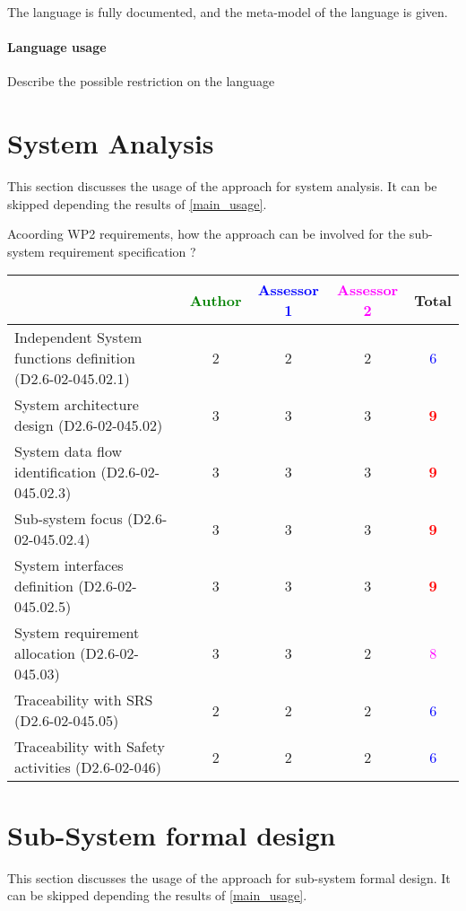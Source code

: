 The language is fully documented, and the meta-model of the language
is given.
\paragraph{Language usage} Describe the possible restriction on the language

\section{System Analysis}
This section discusses the usage of the approach for system analysis.
It can be skipped depending the results of \ref{main_usage}.

Acoording WP2 requirements, how the approach can be involved for the sub-system requirement specification ?

\begin{tabular}{|l | c | c | c | c|}
\hline
& \textcolor{green}{Author} & \textcolor{blue}{Assessor 1} & \textcolor{magenta}{Assessor 2} & Total \\
\hline
Independent System functions definition (D2.6-02-045.02.1)  &2 &2 & 2    & \textcolor{blue}{6} \\
\hline 
System architecture design (D2.6-02-045.02) &3 &3 & 3    & \textcolor{red}{\textbf{9}} \\
\hline
System data flow identification (D2.6-02-045.02.3)  &3 &3 & 3    & \textcolor{red}{\textbf{9}} \\
\hline
Sub-system focus (D2.6-02-045.02.4)  &3 &3 & 3    & \textcolor{red}{\textbf{9}} \\
\hline
System interfaces definition (D2.6-02-045.02.5)  &3 &3 & 3    & \textcolor{red}{\textbf{9}} \\
\hline
System requirement allocation (D2.6-02-045.03)  &3 &3 & 2    &  \textcolor{magenta}{8}  \\
\hline
Traceability with SRS (D2.6-02-045.05)  &2 &2 & 2    & \textcolor{blue}{6}  \\
\hline
Traceability with Safety activities (D2.6-02-046)  &2 &2 & 2     & \textcolor{blue}{6}   \\
\hline
\end{tabular}



\section{Sub-System formal design}
This section discusses the usage of the approach for sub-system formal design.
It can be skipped depending the results of \ref{main_usage}.

